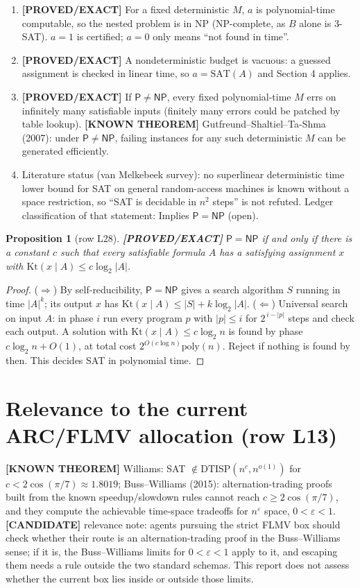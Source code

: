 \documentclass[11pt]{article}
\newtheorem{proposition}{Proposition}
\theoremstyle{remark}
\newcommand{\Kt}{\mathrm{Kt}}
\newcommand{\cP}{\mathsf{P}}
\newcommand{\NP}{\mathsf{NP}}
\newcommand{\status}[1]{\textbf{[#1]}}
\begin{document}
\begin{enumerate}
\item \status{PROVED/EXACT} For a fixed deterministic $M$, $a$ is polynomial-time computable, so the
nested problem is in NP (NP-complete, as $B$ alone is 3-SAT). $a=1$ is certified; $a=0$ only means
``not found in time''.
\item \status{PROVED/EXACT} A nondeterministic budget is vacuous: a guessed assignment is checked in
linear time, so $a=\mathrm{SAT}(A)$ and Section 4 applies.
\item \status{PROVED/EXACT} If $\cP\neq\NP$, every fixed polynomial-time $M$ errs on infinitely many
satisfiable inputs (finitely many errors could be patched by table lookup). \status{KNOWN THEOREM}
Gutfreund--Shaltiel--Ta-Shma (2007): under $\cP\neq\NP$, failing instances for any such deterministic
$M$ can be generated efficiently.
\item Literature status (van Melkebeek survey): no superlinear deterministic time lower bound for SAT
on general random-access machines is known without a space restriction, so ``SAT is decidable in
$n^2$ steps'' is not refuted. Ledger classification of that statement: Implies $\cP=\NP$ (open).
\end{enumerate}

\begin{proposition}[row L28] \status{PROVED/EXACT}
$\cP=\NP$ if and only if there is a constant $c$ such that every satisfiable formula $A$ has a
satisfying assignment $x$ with $\Kt(x\mid A)\le c\log_2|A|$.
\end{proposition}
\begin{proof}
($\Rightarrow$) By self-reducibility, $\cP=\NP$ gives a search algorithm $S$ running in time
$|A|^k$; its output $x$ has $\Kt(x\mid A)\le |S|+k\log_2|A|$.
($\Leftarrow$) Universal search on input $A$: in phase $i$ run every program $p$ with $|p|\le i$ for
$2^{\,i-|p|}$ steps and check each output. A solution with $\Kt(x\mid A)\le c\log_2 n$ is found by
phase $c\log_2 n+O(1)$, at total cost $2^{O(c\log n)}\mathrm{poly}(n)$. Reject if nothing is found by
then. This decides SAT in polynomial time.
\end{proof}

\section{Relevance to the current ARC/FLMV allocation (row L13)}

\status{KNOWN THEOREM} Williams: SAT $\notin\mathrm{DTISP}(n^{c},n^{o(1)})$ for $c<2\cos(\pi/7)\approx 1.8019$;
Buss--Williams (2015): alternation-trading proofs built from the known speedup/slowdown rules cannot
reach $c\ge 2\cos(\pi/7)$, and they compute the achievable time-space tradeoffs for $n^{\varepsilon}$
space, $0<\varepsilon<1$.
\status{CANDIDATE} relevance note: agents pursuing the strict FLMV box should check whether their route
is an alternation-trading proof in the Buss--Williams sense; if it is, the Buss--Williams limits for
$0<\varepsilon<1$ apply to it, and escaping them needs a rule outside the two standard schemas.
This report does not assess whether the current box lies inside or outside those limits.
\end{document}
